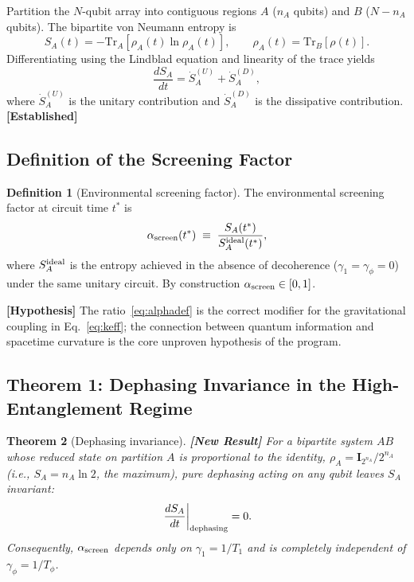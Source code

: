 \documentclass[12pt,letterpaper]{article}
\newtheorem{theorem}{Theorem}[section]
\theoremstyle{definition}
\newtheorem{definition}[theorem]{Definition}
\theoremstyle{remark}
\newcommand{\established}{\textbf{[Established]}}
\newcommand{\hypothesis}{\textbf{[Hypothesis]}}
\newcommand{\newresult}{\textbf{[New Result]}}
\newcommand{\ascreen}{\alpha_{\rm screen}}
\newcommand{\Sideal}{S_{A}^{\rm ideal}}
\newcommand{\gammaone}{\gamma_{1}}
\newcommand{\gammaphi}{\gamma_{\phi}}
\begin{document}
Partition the $N$-qubit array into contiguous regions $A$ ($n_A$ qubits) and
$B$ ($N-n_A$ qubits).  The bipartite von Neumann entropy is
\begin{equation}
S_A(t) = -\mathrm{Tr}_A\!\left[\rho_A(t)\ln\rho_A(t)\right],
\qquad \rho_A(t) = \mathrm{Tr}_B[\rho(t)].
\end{equation}
Differentiating using the Lindblad equation and linearity of the trace yields
\begin{equation}
\frac{dS_A}{dt} = \dot{S}_A^{(U)} + \dot{S}_A^{(D)},
\end{equation}
where $\dot{S}_A^{(U)}$ is the unitary contribution and $\dot{S}_A^{(D)}$ is the
dissipative contribution.  \established{}

\subsection{Definition of the Screening Factor}

\begin{definition}[Environmental screening factor]
The environmental screening factor at circuit time $t^*$ is
\begin{equation}
\ascreen(t^*) \;\equiv\; \frac{S_A(t^*)}{\Sideal(t^*)},
\label{eq:alphadef}
\end{equation}
where $\Sideal$ is the entropy achieved in the absence of decoherence
($\gammaone = \gammaphi = 0$) under the same unitary circuit.
By construction $\ascreen\in[0,1]$.
\end{definition}

\hypothesis{} The ratio~\eqref{eq:alphadef} is the correct modifier for the
gravitational coupling in Eq.~\eqref{eq:keff}; the connection between quantum
information and spacetime curvature is the core unproven hypothesis of the program.

\subsection{Theorem 1: Dephasing Invariance in the High-Entanglement Regime}

\begin{theorem}[Dephasing invariance] \label{thm:dephasing}
\newresult{}
For a bipartite system $AB$ whose reduced state on partition $A$ is proportional to the
identity, $\rho_A = \mathbf{I}_{2^{n_A}}/2^{n_A}$ (i.e., $S_A = n_A\ln 2$, the
maximum), pure dephasing acting on \emph{any} qubit leaves $S_A$ invariant:
\begin{equation}
\left.\frac{dS_A}{dt}\right|_{\rm dephasing} = 0.
\end{equation}
Consequently, $\ascreen$ depends only on $\gammaone = 1/T_1$ and is completely
independent of $\gammaphi = 1/T_\phi$.
\end{theorem}
\end{document}
